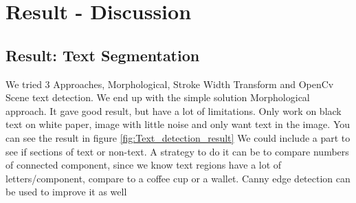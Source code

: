 \documentclass[Report.tex]{subfiles}
\begin{document}
\chapter{Result - Discussion}
\label{chap:Result - Discussion}
\section{Result: Text Segmentation}
We tried 3 Approaches, Morphological, Stroke Width Transform and OpenCv Scene text detection. We end up with the simple solution Morphological approach. It gave good result, but have a lot of limitations. Only work on black text on white paper, image with little noise and only want text in the image. You can see the result in figure \ref{fig:Text_detection_result} We could include a part to see if sections of text or non-text. A strategy to do it can be to compare  numbers of connected component, since we know text regions have a lot of letters/component, compare to a coffee cup or a wallet. Canny edge detection can be used to improve it as well  
\end{document}
